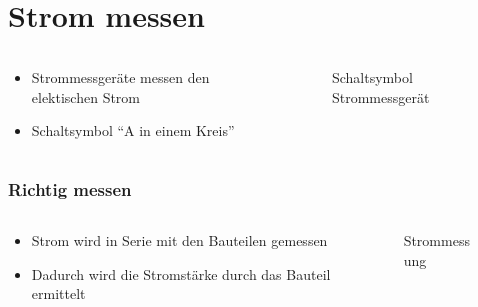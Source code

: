 
\section{Strom messen}
\label{section:strommessung}
\begin{frame}%

\begin{columns}
    \begin{column}{0.48\textwidth}
    \begin{itemize}
  \item Strommessgeräte messen den elektischen Strom
  \item Schaltsymbol \enquote{A in einem Kreis} 
  \end{itemize}

    \end{column}
   \begin{column}{0.48\textwidth}
       
\begin{figure}
    \caption{\scriptsize Schaltsymbol Strommessgerät}
    \label{n_messgeraete_symbol_strommessgerät}
\end{figure}


   \end{column}
\end{columns}

\end{frame}

\begin{frame}
\frametitle{Richtig messen}
\begin{columns}
    \begin{column}{0.48\textwidth}
    \begin{itemize}
  \item Strom wird in Serie mit den Bauteilen gemessen
  \item Dadurch wird die Stromstärke durch das Bauteil ermittelt
  \end{itemize}

    \end{column}
   \begin{column}{0.48\textwidth}
       
\begin{figure}
    \caption{\scriptsize Strommessung}
    \label{n_messgeraete_strommessung}
\end{figure}


   \end{column}
\end{columns}

\end{frame}

